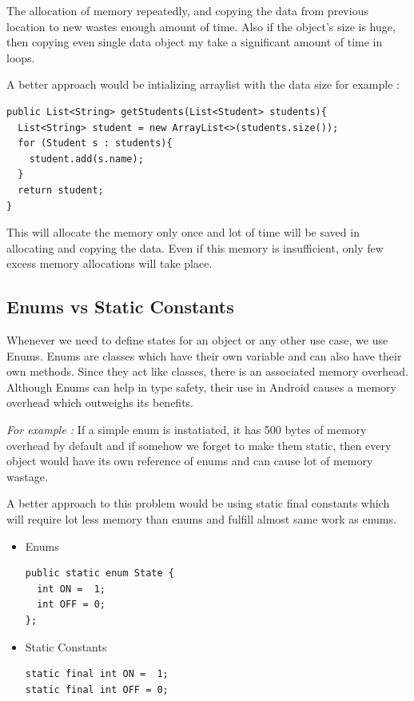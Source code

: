 \documentclass[journal]{IEEEtran}
\begin{document}
The allocation of memory repeatedly, and copying the data from previous location to new wastes enough amount of time. Also if the object's size is huge, then copying even single data object my take a significant amount of time in loops.

A better approach would be intializing arraylist with the data size for example :

\begin{verbatim}
public List<String> getStudents(List<Student> students){
  List<String> student = new ArrayList<>(students.size());
  for (Student s : students){
    student.add(s.name);
  }
  return student;
}
\end{verbatim}
This will allocate the memory only once and lot of time will be saved in allocating and copying
the data. Even if this memory is insufficient, only few excess memory allocations will take place.


\subsection{Enums vs Static Constants}
Whenever we need to define states for an object or any other use case, we use Enums. Enums are classes which have their own variable and can also have their own methods. Since they act like classes, there is an associated memory overhead. Although Enums can help in type safety, their use in Android causes a memory overhead which outweighs its benefits.

\emph{For example :} If a simple enum is instatiated, it has 500 bytes of memory overhead by default and if somehow we forget to make them static, then every object would have its own reference of enums and can cause lot of memory wastage.

A better approach to this problem would be using static final constants which will require lot less memory than enums and fulfill almost same work as enums.

\begin{itemize}
	\item Enums
\begin{verbatim}
public static enum State {
  int ON =  1;
  int OFF = 0;
};
\end{verbatim}
	\item Static Constants
\begin{verbatim}
static final int ON =  1;
static final int OFF = 0;
\end{verbatim}
\end{itemize}
\end{document}
